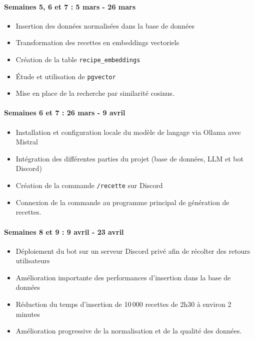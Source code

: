 \documentclass[12pt]{article}
\begin{document}
            \paragraph{Semaines 5, 6 et 7 : 5 mars - 26 mars}
                \begin{itemize}
                    \item Insertion des données normalisées dans la base de données 
                    \item Transformation des recettes en embeddings vectoriels 
                    \item Création de la table \texttt{recipe\_embeddings} 
                    \item Étude et utilisation de \texttt{pgvector} 
                    \item Mise en place de la recherche par similarité cosinus.
                \end{itemize}

            \paragraph{Semaines 6 et 7 : 26 mars - 9 avril}
                \begin{itemize}
                    \item Installation et configuration locale du modèle de langage via Ollama avec Mistral 
                    \item Intégration des différentes parties du projet (base de données, LLM et bot Discord) 
                    \item Création de la commande \texttt{/recette} sur Discord 
                    \item Connexion de la commande au programme principal de génération de recettes.
                \end{itemize}

            \paragraph{Semaines 8 et 9 : 9 avril - 23 avril}
                \begin{itemize}
                    \item Déploiement du bot sur un serveur Discord privé afin de récolter des retours utilisateurs 
                    \item Amélioration importante des performances d’insertion dans la base de données 
                    \item Réduction du temps d’insertion de 10\,000 recettes de 2h30 à environ 2 minutes 
                    \item Amélioration progressive de la normalisation et de la qualité des données.
                \end{itemize}
\end{document}
